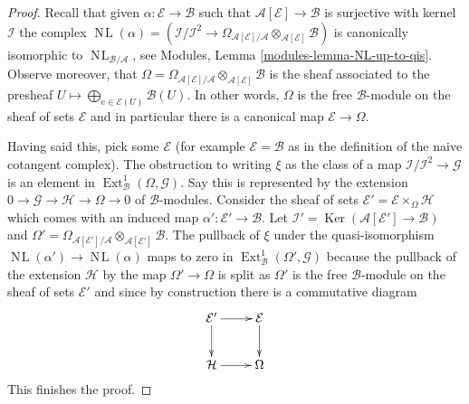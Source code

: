 \documentclass[10pt,a4paper]{amsart}
\theoremstyle{plain}
\theoremstyle{definition}
\theoremstyle{remark}
\numberwithin{equation}{subsection}
\def\Ext{\mathop{\mathrm{Ext}}\nolimits}
\def\NL{\mathop{N\!L}\nolimits}
\def\Ker{\mathop{\mathrm{Ker}}}
\begin{document}
\begin{proof}
Recall that given $\alpha : \mathcal{E} \to \mathcal{B}$
such that $\mathcal{A}[\mathcal{E}] \to \mathcal{B}$ is surjective
with kernel $\mathcal{I}$ the complex
$\NL(\alpha) = (\mathcal{I}/\mathcal{I}^2 \to 
\Omega_{\mathcal{A}[\mathcal{E}]/\mathcal{A}}
\otimes_{\mathcal{A}[\mathcal{E}]} \mathcal{B})$ is canonically
isomorphic to $\NL_{\mathcal{B}/\mathcal{A}}$, see
Modules, Lemma \ref{modules-lemma-NL-up-to-qis}.
Observe moreover, that
$\Omega = \Omega_{\mathcal{A}[\mathcal{E}]/\mathcal{A}}
\otimes_{\mathcal{A}[\mathcal{E}]} \mathcal{B}$ is the sheaf
associated to the presheaf
$U \mapsto \bigoplus_{e \in \mathcal{E}(U)} \mathcal{B}(U)$.
In other words, $\Omega$ is the free $\mathcal{B}$-module on the
sheaf of sets $\mathcal{E}$ and in particular there is a canonical
map $\mathcal{E} \to \Omega$.

\medskip\noindent
Having said this, pick some $\mathcal{E}$ (for example
$\mathcal{E} = \mathcal{B}$ as in the definition of the naive cotangent
complex). The obstruction to writing $\xi$ as the class of a map
$\mathcal{I}/\mathcal{I}^2 \to \mathcal{G}$ is an element in
$\Ext^1_\mathcal{B}(\Omega, \mathcal{G})$. Say this is represented
by the extension $0 \to \mathcal{G} \to \mathcal{H} \to \Omega \to 0$
of $\mathcal{B}$-modules. Consider the sheaf of sets
$\mathcal{E}' = \mathcal{E} \times_\Omega \mathcal{H}$
which comes with an induced map $\alpha' : \mathcal{E}' \to \mathcal{B}$.
Let $\mathcal{I}' = \Ker(\mathcal{A}[\mathcal{E}'] \to \mathcal{B})$
and $\Omega' = \Omega_{\mathcal{A}[\mathcal{E}']/\mathcal{A}}
\otimes_{\mathcal{A}[\mathcal{E}']} \mathcal{B}$.
The pullback of $\xi$ under the quasi-isomorphism
$\NL(\alpha') \to \NL(\alpha)$ maps to zero in
$\Ext^1_\mathcal{B}(\Omega', \mathcal{G})$
because the pullback of the extension $\mathcal{H}$
by the map $\Omega' \to \Omega$ is split as $\Omega'$ is the free
$\mathcal{B}$-module on the sheaf of sets $\mathcal{E}'$ and since
by construction there is a commutative diagram
$$
\xymatrix{
\mathcal{E}' \ar[r] \ar[d] & \mathcal{E} \ar[d] \\
\mathcal{H} \ar[r] & \Omega
}
$$
This finishes the proof.
\end{proof}
\end{document}
